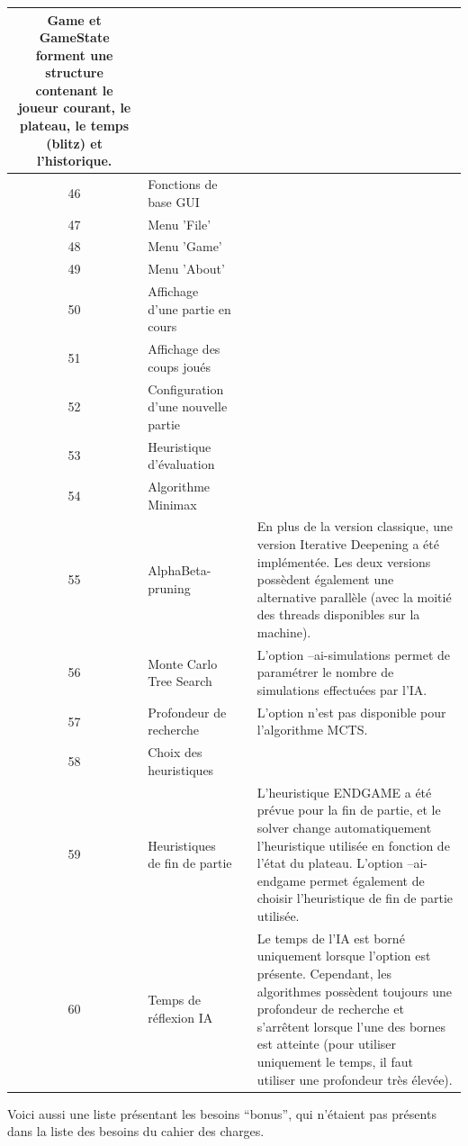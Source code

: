 \documentclass{article}
\newcommand{\valid}{\textcolor{green}{\ding{108}}}  %
\begin{document}
\begin{longtable}{|c|p{5cm}|c|p{5cm}|}
    Game et GameState forment une structure contenant le joueur courant, le plateau, le temps (blitz) et l'historique.\\
    \hline
    46 & Fonctions de base GUI & \valid & \\
    \hline
    47 & Menu 'File' & \valid & \\
    \hline
    48 & Menu 'Game' & \valid & \\
    \hline
    49 & Menu 'About' & \valid & \\
    \hline
    50 & Affichage d'une partie en cours & \valid & \\
    \hline
    51 & Affichage des coups joués & \valid & \\
    \hline
    52 & Configuration d'une nouvelle partie & \valid & \\
    \hline
    53 & Heuristique d'évaluation & \valid & \\
    \hline
    54 & Algorithme Minimax & \valid & \\
    \hline
    55 & AlphaBeta-pruning & \valid & En plus de la version classique, une version Iterative Deepening a été implémentée. Les deux versions possèdent également une alternative parallèle (avec la moitié des threads disponibles sur la machine). \\
    \hline
    56 & Monte Carlo Tree Search & \valid & L'option --ai-simulations permet de paramétrer le nombre de simulations effectuées par l'IA. \\
    \hline
    57 & Profondeur de recherche & \valid & L'option n'est pas disponible pour l'algorithme MCTS. \\
    \hline
    58 & Choix des heuristiques & \valid & \\
    \hline
    59 & Heuristiques de fin de partie & \valid & L'heuristique ENDGAME a été prévue pour la fin de partie, et le solver change automatiquement l'heuristique utilisée en fonction de l'état du plateau. L'option --ai-endgame permet également de choisir l'heuristique de fin de partie utilisée. \\
    \hline
    60 & Temps de réflexion IA & \valid & Le temps de l'IA est borné uniquement lorsque l'option est présente. Cependant, les algorithmes possèdent toujours une profondeur de recherche et s'arrêtent lorsque l'une des bornes est atteinte (pour utiliser uniquement le temps, il faut utiliser une profondeur très élevée). \\
    \hline
\end{longtable}

Voici aussi une liste présentant les besoins ``bonus'', qui n'étaient pas présents dans la liste des besoins du cahier des charges.
\end{document}
